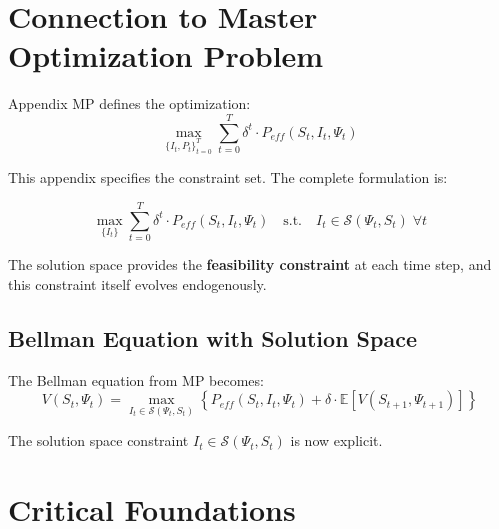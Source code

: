 \section{Connection to Master Optimization Problem}
\label{sec:ss-mp-connection}

Appendix MP defines the optimization:
\begin{equation}
\max_{\{I_t, P_t\}_{t=0}^T} \sum_{t=0}^{T} \delta^t \cdot P_{eff}(S_t, I_t, \Psi_t)
\end{equation}

This appendix specifies the constraint set. The complete formulation is:

\begin{equation}
\boxed{
\max_{\{I_t\}} \sum_{t=0}^{T} \delta^t \cdot P_{eff}(S_t, I_t, \Psi_t) \quad \text{s.t.} \quad I_t \in \mathcal{S}(\Psi_t, S_t) \; \forall t
}
\end{equation}

The solution space provides the \textbf{feasibility constraint} at each time step, and this constraint itself evolves endogenously.

\subsection{Bellman Equation with Solution Space}

The Bellman equation from MP becomes:
\begin{equation}
V(S_t, \Psi_t) = \max_{I_t \in \mathcal{S}(\Psi_t, S_t)} \left\{ P_{eff}(S_t, I_t, \Psi_t) + \delta \cdot \mathbb{E}[V(S_{t+1}, \Psi_{t+1})] \right\}
\end{equation}

The solution space constraint $I_t \in \mathcal{S}(\Psi_t, S_t)$ is now explicit.

\section{Critical Foundations}
\label{sec:ss-foundations}

